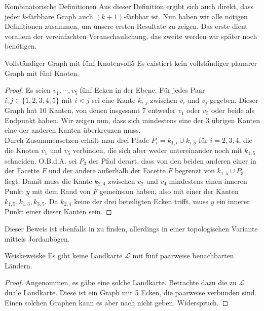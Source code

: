 \begin{section}{Kombinatorische Definitionen}
  Aus dieser Definition ergibt sich auch direkt, dass jeder $k$-färbbare Graph auch $(k+1)$-färbbar ist. Nun haben wir alle nötigen Definitionen zusammen, um unsere ersten Resultate zu zeigen. Das erste dient vorallem der vereinfachten Veranschaulichung, das zweite werden wir später noch benötigen.
  
  \begin{satzl}{Vollständiger Graph mit fünf Knoten}{voll5}
   Es existiert kein vollständiger planarer Graph mit fünf Knoten.
  \end{satzl}
  \begin{proof}
    Es seien $v_1,\cdots,v_5$ fünf Ecken in der Ebene. Für jedes Paar $i,j \in \{1,2,3,4,5\}$ mit $i < j$ sei eine Kante $k_{i,j}$ zwischen $v_i$ und $v_j$ gegeben. Dieser Graph hat $10$ Kanten, von denen insgesamt $7$ entweder $v_1$ oder $v_5$ oder beide als Endpunkt haben. Wir zeigen nun, dass sich mindestens eine der $3$ übrigen Kanten eine der anderen Kanten überkreuzen muss.\\
    Durch Zusammensetzen erhält man drei Pfade $P_i = k_{1,i} \cup k_{i,5}$ für $i = 2,3,4$, die die Knoten $v_1$ und $v_5$ verbinden, die sich aber weder untereinander noch mit $k_{1,5}$ schneiden. O.B.d.A. sei $P_3$ der Pfad derart, dass von den beiden anderen einer in der Facette $F$ und der andere außerhalb der Facette $F$ begrenzt von $k_{1,5} \cup P_3$ liegt. Damit muss die Kante $k_{2,4}$ zwischen $v_2$ und $v_4$ mindestens einen inneren Punkt $y$ mit dem Rand von $F$ gemeinsam haben, also mit einer der Kanten $k_{1,5},k_{1,3},k_{3,5}$. Da $k_{2,4}$ keine der drei beteiligten Ecken trifft, muss $y$ ein innerer Punkt einer dieser Kanten sein.
  \end{proof}
  
  Dieser Beweis ist ebenfalls in \cite[Satz 4.1.2]{fritsch} zu finden, allerdings in einer topologischen Variante mittels Jordanbögen. 
  
 \begin{satzl}{Weiske}{weiske}
  Es gibt keine Landkarte $\mathcal{L}$ mit fünf paarweise benachbarten Ländern.
 \end{satzl}
 \begin{proof}
  Angenommen, es gäbe eine solche Landkarte. Betrachte dazu die zu $\mathcal{L}$ duale Landkarte. Diese ist ein Graph mit 5 Ecken, die paarweise verbunden sind. Einen solchen Graphen kann es aber nach  nicht geben. Widerspruch.
 \end{proof}
\end{section}